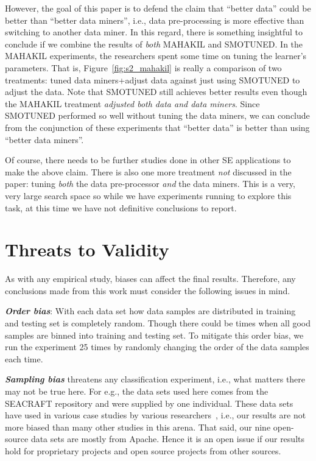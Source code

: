 \documentclass[sigconf]{acmart}
\theoremstyle{break}
\newcommand{\smb}{{\sc SMOTUNED}}
\begin{document}
However, the goal of this paper is to defend the claim that ``better data'' could be better than ``better
data miners'', i.e., data pre-processing is more effective  than switching to another data miner.
In this regard,   there is something insightful to conclude if we combine the results of {\em both}
MAHAKIL and {\smb}.  
In the MAHAKIL experiments, the researchers spent some time on tuning the learner's parameters. That is,  Figure~\ref{fig:s2_mahakil} is really a comparison
of two treatments: tuned data miners+adjust data against just using {\smb} to adjust the data.
Note that {\smb} still achieves better results  even though the MAHAKIL treatment {\em adjusted both
data and data miners}. Since {\smb} performed so well without tuning the data miners,
we can conclude from the conjunction of these experiments that  ``better data'' is better than using   ``better
data miners''.

Of course, there needs to be further studies done in other SE applications to make the above claim. There is also one more treatment {\em not} discussed in the paper: tuning {\em both}
the data pre-processor {\em and} the data miners. This is a very, very large search space
so while we have experiments running to explore this task, at this time we have not definitive
conclusions to report.

\section{Threats to Validity}
\label{sect:validity}

As with any empirical study, biases can affect the final
results. Therefore, any conclusions made from this work must consider the following issues in mind.

\textbf{\textit{Order bias}}: With each data set how data samples are distributed in training and testing set is completely random. Though there could be times when all good samples are binned into training and testing set. To mitigate this order bias, we run
the experiment 25 times by randomly changing the order of the data samples each time.

\textbf{\textit{Sampling bias}} threatens any classification experiment, i.e., what matters there may not be true here. For e.g., the data sets used here comes from the SEACRAFT repository and were supplied by one individual. These data sets have used in various case studies by various researchers~\cite{he2012investigation,peters2013better,peters2013balancing,turhan2013empirical}, i.e., our results are not more biased than many other studies in this arena.
That said, our nine open-source data sets   are mostly from Apache. Hence
it is an open issue if our results hold for
 proprietary projects and open source projects from other sources.
\end{document}
